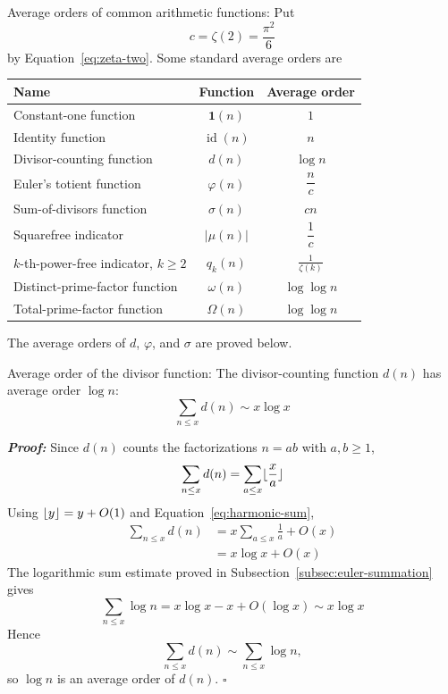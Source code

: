 \documentclass[a4paper,11pt,abstracton]{scrartcl}
\DeclarePairedDelimiter{\floor}{\lfloor}{\rfloor}
\theoremstyle{dotlessP}
\theoremstyle{dotlessS}
\theoremstyle{remark}
\theoremstyle{definition}
\begin{document}
\begin{mainbox}{Average orders of common arithmetic functions:}
Put
\[
    c=\zeta(2)=\frac{\pi^2}{6}
\]
by Equation~\eqref{eq:zeta-two}. Some standard average orders are
\begin{center}
\small
\renewcommand{\arraystretch}{1.35}
\setlength{\tabcolsep}{10pt}
\begin{tabular}{@{}lcc@{}}
    \hline
    {\textbf{Name}}
      &{\textbf{Function}}
      &{\textbf{Average order}}\\
    \hline
    Constant-one function
      & $\mathbf{1}(n)$ & $1$\\
    Identity function
      & $\operatorname{id}(n)$ & $n$\\
    Divisor-counting function
      & $d(n)$ & $\log n$\\
    Euler's totient function
      & $\varphi(n)$ & $\dfrac{n}{c}$\\
    Sum-of-divisors function
      & $\sigma(n)$ & $cn$\\
    Squarefree indicator
      & $|\mu(n)|$ & $\dfrac1c$\\
    $k$-th-power-free indicator, $k\geq2$
      & $q_k(n)$ & $\frac1{\zeta(k)}$\\
    Distinct-prime-factor function
      & $\omega(n)$ & $\log\log n$\\
    Total-prime-factor function
      & $\Omega(n)$ & $\log\log n$\\
    \hline
\end{tabular}
\end{center}
The average orders of $d$, $\varphi$, and $\sigma$ are proved below.
\end{mainbox}

\begin{mainbox}{Average order of the divisor function:}
The divisor-counting function $d(n)$ has average order $\log n$:
\[
    \sum_{n\leq x}d(n)\sim x\log x
\]
\end{mainbox}

\begin{claim_box}
\textbf{\textit{Proof:}}
Since $d(n)$ counts the factorizations $n=ab$ with $a,b\geq1$,
\[
    \sum_{n\leq x}d(n)
      =\sum_{a\leq x}\floor{\frac xa}
\]
Using $\floor{y}=y+O(1)$ and Equation~\eqref{eq:harmonic-sum},
\begin{align*}
    \sum_{n\leq x}d(n)
      &=x\sum_{a\leq x}\frac1a+O(x)\\
      &=x\log x+O(x)
\end{align*}
The logarithmic sum estimate proved in
Subsection~\ref{subsec:euler-summation} gives
\[
    \sum_{n\leq x}\log n
      =x\log x-x+O(\log x)
      \sim x\log x
\]
Hence
\[
    \sum_{n\leq x}d(n)
      \sim\sum_{n\leq x}\log n,
\]
so $\log n$ is an average order of $d(n)$.
\hfill$\square$
\end{claim_box}
\end{document}
